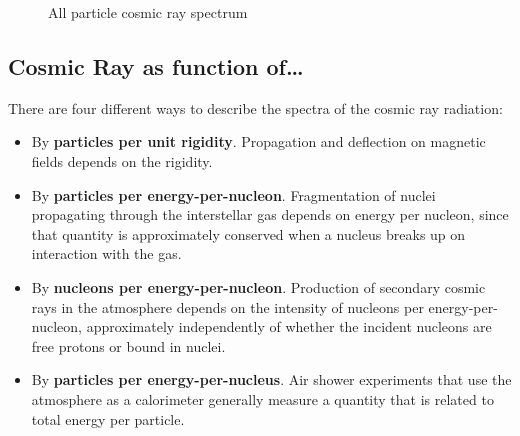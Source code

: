 \documentclass[
  letterpaper,
  DIV=11,
  numbers=noendperiod]{scrreprt}
\providecommand{\tightlist}{%
  \setlength{\itemsep}{0pt}\setlength{\parskip}{0pt}}\usepackage{longtable,booktabs,array}
\begin{document}
\begin{figure}[H]


\caption{\label{fig-cr}All particle cosmic ray spectrum}

\end{figure}%

\subsection{Cosmic Ray as function
of\ldots{}}\label{cosmic-ray-as-function-of}

There are four different ways to describe the spectra of the cosmic ray
radiation:

\begin{itemize}
\tightlist
\item
  By \textbf{particles per unit rigidity}. Propagation and deflection on
  magnetic fields depends on the rigidity.
\item
  By \textbf{particles per energy-per-nucleon}. Fragmentation of nuclei
  propagating through the interstellar gas depends on energy per
  nucleon, since that quantity is approximately conserved when a nucleus
  breaks up on interaction with the gas.
\item
  By \textbf{nucleons per energy-per-nucleon}. Production of secondary
  cosmic rays in the atmosphere depends on the intensity of nucleons per
  energy-per-nucleon, approximately independently of whether the
  incident nucleons are free protons or bound in nuclei.
\item
  By \textbf{particles per energy-per-nucleus}. Air shower experiments
  that use the atmosphere as a calorimeter generally measure a quantity
  that is related to total energy per particle.
\end{itemize}
\end{document}

